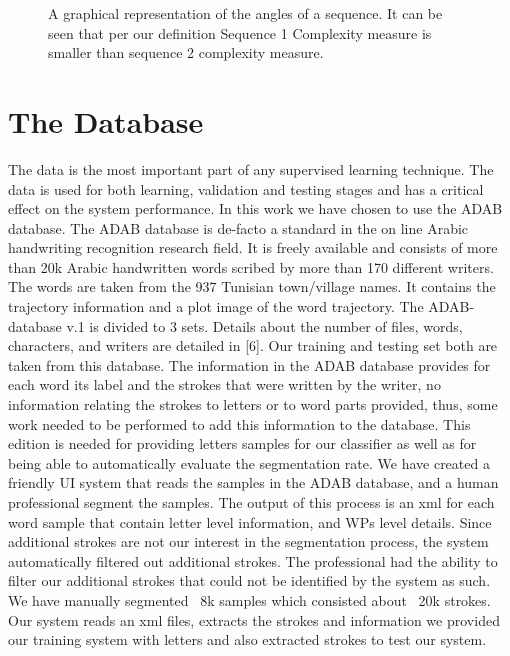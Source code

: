 \documentclass[12pt,journal,compsoc]{IEEEtran}
\begin{document}
\begin{figure}[h]
     \begin{center}
    \end{center}
    \caption{A graphical representation of the angles of a sequence. It can be seen that per our definition Sequence 1 Complexity measure is smaller than sequence 2 complexity measure.}
   \label{fig:sequence_complexity}
\end{figure}

\section{The Database}
The data is the most important part of any supervised learning technique. The data is used for both learning, validation and testing stages and has a critical effect on the system performance. In this work we have chosen to use the ADAB database. The ADAB database is de-facto a standard in the on line Arabic handwriting recognition research field. It is freely available and consists of more than 20k Arabic handwritten words scribed by more than 170 different writers. The words are taken from the 937 Tunisian town/village names. It contains the trajectory information and a plot image of the word trajectory. The ADAB-database v.1 is divided to 3 sets. Details about the number of files, words, characters, and writers are detailed in [6]. Our training and testing set both are taken from this database. 
The information in the ADAB database provides for each word its label and the strokes that were written by the writer, no information relating the strokes to letters or to word parts provided, thus, some work needed to be performed to add this information to the database. This edition is needed for providing letters samples for our classifier as well as for being able to automatically evaluate the segmentation rate. We have created a friendly UI system that reads the samples in the ADAB database, and a human professional segment the samples. The output of this process is an xml for each word sample that contain letter level information, and WPs level details. Since additional strokes are not our interest in the segmentation process, the system automatically filtered out additional strokes. The professional had the ability to filter our additional strokes that could not be identified by the system as such. We have manually segmented ~8k samples which consisted about ~20k strokes.
Our system reads an xml files, extracts the strokes and information we provided our training system with letters and also extracted strokes to test our system. 
\end{document}
